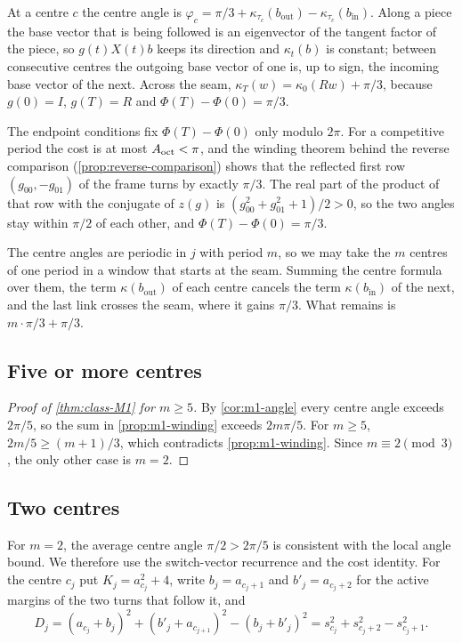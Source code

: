  At a centre $c$ the centre angle is
$\varphi_c=\pi/3+\kappa_{\tau_c}(b_{\mathrm{out}})-\kappa_{\tau_c}(b_{\mathrm{in}})$. Along a piece
the base vector that is being followed is an eigenvector of the tangent factor of the piece, so
$g(t)X(t)b$ keeps its direction and $\kappa_t(b)$ is constant; between consecutive centres the
outgoing base vector of one is, up to sign, the incoming base vector of the next. Across the
seam, $\kappa_T(w)=\kappa_0(Rw)+\pi/3$, because $g(0)=I$, $g(T)=R$ and $\Phi(T)-\Phi(0)=\pi/3$.

 The endpoint conditions fix $\Phi(T)-\Phi(0)$ only
modulo $2\pi$. For a competitive period the cost is at most $A_{\mathrm{oct}}<\pi$, and the winding theorem
behind the reverse comparison (\cref{prop:reverse-comparison}) shows that the reflected first row
$(g_{00},-g_{01})$ of the frame turns by exactly $\pi/3$. The real part of the product of that row
with the conjugate of $z(g)$ is $(g_{00}^2+g_{01}^2+1)/2>0$, so the two angles stay within $\pi/2$
of each other, and $\Phi(T)-\Phi(0)=\pi/3$.

 The centre angles are periodic in $j$ with period $m$, so we may take the $m$
centres of one period in a window that starts at the seam. Summing the centre formula over them,
the term $\kappa(b_{\mathrm{out}})$ of each centre cancels the term $\kappa(b_{\mathrm{in}})$ of
the next, and the last link crosses the seam, where it gains $\pi/3$. What remains is
$m\cdot\pi/3+\pi/3$.

\subsection{Five or more centres}

\begin{proof}[Proof of \cref{thm:class-M1} for $m\ge5$]
  By \cref{cor:m1-angle} every centre angle exceeds $2\pi/5$, so the sum in
  \cref{prop:m1-winding} exceeds $2m\pi/5$. For $m\ge5$, $2m/5\ge(m+1)/3$, which contradicts
  \cref{prop:m1-winding}. Since $m\equiv2\pmod3$, the only other case is $m=2$.
\end{proof}

\subsection{Two centres}

For $m=2$, the average centre angle $\pi/2>2\pi/5$ is consistent with the local angle bound.
We therefore use the switch-vector recurrence and the cost identity. For the centre
$c_j$ put $K_j=a_{c_j}^2+4$, write $b_j=a_{c_j+1}$ and $b'_j=a_{c_j+2}$ for the active margins of
the two turns that follow it, and
\[
  D_j=(a_{c_j}+b_j)^2+(b'_j+a_{c_{j+1}})^2-(b_j+b'_j)^2=s_{c_j}^2+s_{c_j+2}^2-s_{c_j+1}^2 .
\]

